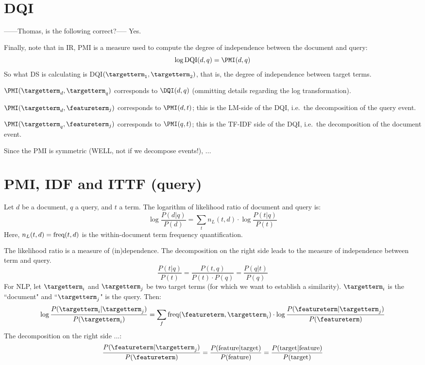 \section{DQI}

------Thomas, is the following correct?-----
Yes.

Finally, note that in IR, PMI is a measure used to compute the degree of independence between the document and query:
\[
\log\textmd{DQI}(d,q) = \PMI(d,q)
\] 
So what DS is calculating is DQI$(\targetterm_1, \targetterm_2)$, that is,  the degree of independence between target terms.



$\PMI(\targetterm_d,\targetterm_q)$ corresponds to $\DQI(d,q)$ (ommitting details regarding the log transformation).

$\PMI(\targetterm_d,\featureterm_j)$ corresponds to
$\PMI(d,t)$; this is the LM-side of the DQI, i.e.~the decomposition of the query event.

$\PMI(\targetterm_q,\featureterm_j)$ corresponds to
$\PMI(q,t)$; this is the TF-IDF side
of the DQI, i.e.~the decomposition of the document event.

Since the PMI is symmetric (WELL, not if we decompose events!), ...





\section{PMI, IDF and ITTF (query)}
\label{sec:PMI-IDF-ITTF-(query)}


Let $d$ be a document, $q$ a query, and $t$ a term.
The logarithm of likelihood ratio of document and query is:
\[
\log\frac{P(d|q)}{P(d)} =
	\sum_t n_L(t,d) \cdot \log\frac{P(t|q)}{P(t)}
\]
Here, $n_L(t,d)=\textmd{freq}(t,d)$ is the within-document term frequency
quantification.

The likelihood ratio is a measure of (in)dependence.
The decomposition on the right side leads to the measure of independence
between term and query.
\[
\frac{P(t|q)}{P(t)} = \frac{P(t,q)}{P(t) \cdot P(q)} = \frac{P(q|t)}{P(q)}
\]
For NLP, let $\targetterm_i$ and $\targetterm_j$ be two target terms
(for which we want to establish a similarity).
$\targetterm_i$ is the ``document" and ``$\targetterm_j$" is the query.
Then:
\[
\log\frac{P(\targetterm_i|\targetterm_j)}{P(\targetterm_i)} =
	\sum_f \textmd{freq}(\featureterm,\targetterm_i) \cdot \log\frac{P(\featureterm|\targetterm_j)}{P(\featureterm)}
\]
The decomposition on the right side ...:
\[
\frac{P(\featureterm|\targetterm_j)}{P(\featureterm)} =
\frac{P(\textmd{feature}|\textmd{target})}{P(\textmd{feature})} =
\frac{P(\textmd{target}|\textmd{feature})}{P(\textmd{target})}
\]

